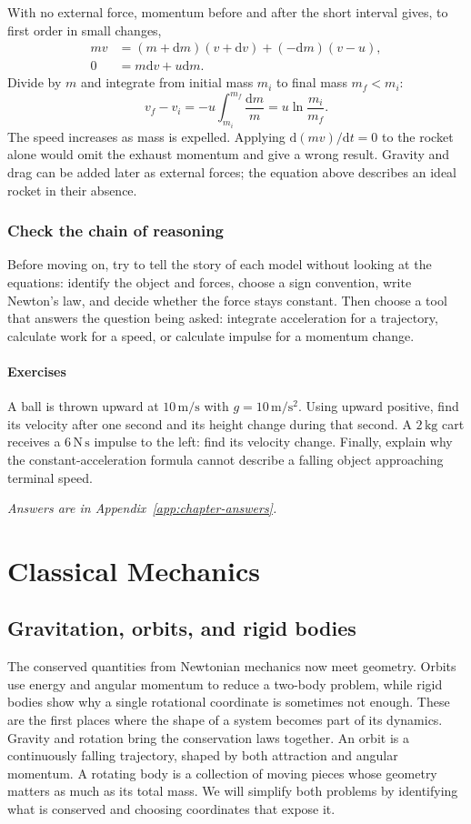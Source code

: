 \documentclass[11pt,oneside]{book}
\newcommand{\dd}{\mathrm{d}}
\theoremstyle{reviewstyle}
\newcommand{\learningcheck}[1]{\subsection*{Exercises}\noindent #1\par\smallskip\noindent\emph{Answers are in Appendix~\ref{app:chapter-answers}.}}
\begin{document}
With no external force, momentum before and after the short interval gives, to first order in small changes,
\begin{align}
mv&=(m+\dd m)(v+\dd v)+(-\dd m)(v-u),\\
0&=m\dd v+u\dd m.
\end{align}
Divide by $m$ and integrate from initial mass $m_i$ to final mass $m_f<m_i$:
\begin{equation}
v_f-v_i=-u\int_{m_i}^{m_f}\frac{\dd m}{m}
=u\ln\frac{m_i}{m_f}.
\end{equation}
The speed increases as mass is expelled. Applying $\dd(mv)/\dd t=0$ to the rocket alone would omit the exhaust momentum and give a wrong result. Gravity and drag can be added later as external forces; the equation above describes an ideal rocket in their absence.

\section*{Check the chain of reasoning}
Before moving on, try to tell the story of each model without looking at the equations: identify the object and forces, choose a sign convention, write Newton's law, and decide whether the force stays constant. Then choose a tool that answers the question being asked: integrate acceleration for a trajectory, calculate work for a speed, or calculate impulse for a momentum change.

\learningcheck{A ball is thrown upward at $10\,\mathrm{m/s}$ with $g=10\,\mathrm{m/s^2}$. Using upward positive, find its velocity after one second and its height change during that second. A $2\,\mathrm{kg}$ cart receives a $6\,\mathrm{N\,s}$ impulse to the left: find its velocity change. Finally, explain why the constant-acceleration formula cannot describe a falling object approaching terminal speed.}

\part{Classical Mechanics}
\chapter{Gravitation, orbits, and rigid bodies}
The conserved quantities from Newtonian mechanics now meet geometry. Orbits use energy and angular momentum to reduce a two-body problem, while rigid bodies show why a single rotational coordinate is sometimes not enough. These are the first places where the shape of a system becomes part of its dynamics.
Gravity and rotation bring the conservation laws together. An orbit is a continuously falling trajectory, shaped by both attraction and angular momentum. A rotating body is a collection of moving pieces whose geometry matters as much as its total mass. We will simplify both problems by identifying what is conserved and choosing coordinates that expose it.
\end{document}
